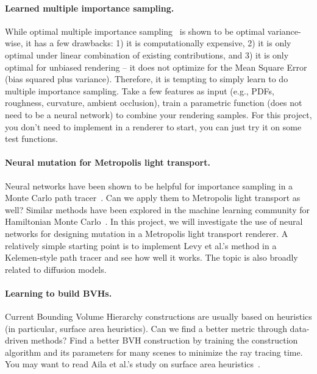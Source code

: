 \paragraph{Learned multiple importance sampling.}
While optimal multiple importance sampling~\cite{Kondapaneni:2019:OMI} is shown to be optimal variance-wise, it has a few drawbacks: 1) it is computationally expensive, 2) it is only optimal under linear combination of existing contributions, and 3) it is only optimal for unbiased rendering -- it does not optimize for the Mean Square Error (bias squared plus variance). Therefore, it is tempting to simply learn to do multiple importance sampling. Take a few features as input (e.g., PDFs, roughness, curvature, ambient occlusion), train a parametric function (does not need to be a neural network) to combine your rendering samples. For this project, you don't need to implement in a renderer to start, you can just try it on some test functions.

\paragraph{Neural mutation for Metropolis light transport.}
Neural networks have been shown to be helpful for importance sampling in a Monte Carlo path tracer~\cite{Muller:2019:NIS}.
Can we apply them to Metropolis light transport as well?
Similar methods have been explored in the machine learning community for Hamiltonian Monte Carlo~\cite{Levy:2018:GHM}.
In this project, we will investigate the use of neural networks for designing mutation in a Metropolis light transport renderer.
A relatively simple starting point is to implement Levy et al.'s method in a Kelemen-style path tracer and see how well it works. 
The topic is also broadly related to diffusion models.

\paragraph{Learning to build BVHs.}
Current Bounding Volume Hierarchy constructions are usually based on heuristics (in particular, surface area heuristics). Can we find a better metric through data-driven methods? Find a better BVH construction by training the construction algorithm and its parameters for many scenes to minimize the ray tracing time. You may want to read Aila et al.'s study on surface area heuristics~\cite{Aila:2013:QMB}.

